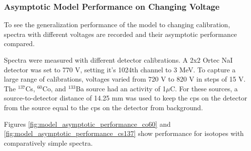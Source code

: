 \subsubsection{Asymptotic Model Performance on Changing Voltage}

To see the generalization performance of the model to changing calibration, spectra with different voltages are recorded and their asymptotic performance compared.

Spectra were measured with different detector calibrations. A 2x2 Ortec NaI detector was set to 770 V, setting it's 1024th channel to 3 MeV. To capture a large range of calibrations, voltages varied from 720 V to 820 V in steps of 15 V. The $^{137}$Cs, $^{60}$Co, and $^{133}$Ba source had an activity of 1$\mu$C. For these sources, a source-to-detector distance of 14.25 mm was used to keep the cps on the detector from the source equal to the cps on the detector from background.

Figures \ref{fig:model_asymptotic_performance_co60} and \ref{fig:model_asymptotic_performance_cs137} show performance for isotopes with comparatively simple spectra.


